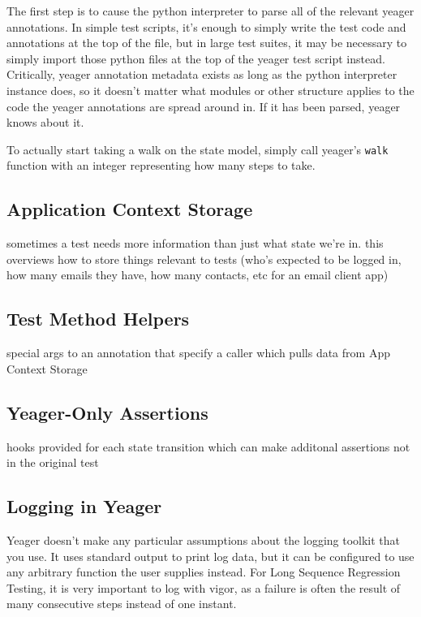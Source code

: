 The first step is to cause the python interpreter to parse all of the relevant yeager annotations. In simple test scripts, it's enough to simply write the test code and annotations at the top of the file, but in large test suites, it may be necessary to simply import those python files at the top of the yeager test script instead. Critically, yeager annotation metadata exists as long as the python interpreter instance does, so it doesn't matter what modules or other structure applies to the code the yeager annotations are spread around in. If it has been parsed, yeager knows about it.

To actually start taking a walk on the state model, simply call yeager's \texttt{walk} function with an integer representing how many steps to take.


\subsection{Application Context Storage}
sometimes a test needs more information than just what state we're in. this overviews how to store things relevant to tests (who's expected to be logged in, how many emails they have, how many contacts, etc for an email client app) %

\subsection{Test Method Helpers}
special args to an annotation that specify a caller which pulls data from App Context Storage %

\subsection{Yeager-Only Assertions}
hooks provided for each state transition which can make additonal assertions not in the original test %

\subsection{Logging in Yeager}
Yeager doesn't make any particular assumptions about the logging toolkit that you use. It uses standard output to print log data, but it can be configured to use any arbitrary function the user supplies instead. For Long Sequence Regression Testing, it is very important to log with vigor, as a failure is often the result of many consecutive steps instead of one instant. %

